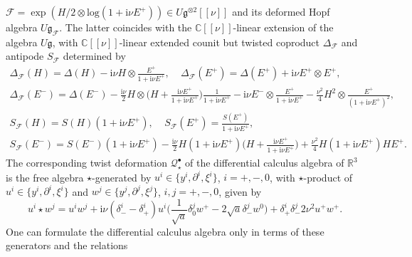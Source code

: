 \documentclass[a4paper,11pt]{article}
\begin{document}
$\mathcal{F}=\exp(H/2\otimes\mathrm{log}(1+\mathrm{i}\nu E^+))
\in U\mathfrak{g}^{\otimes 2}[[\nu]]$ and its deformed Hopf algebra
$U\mathfrak{g}_\mathcal{F}$. The latter coincides with the $\mathbb{C}[[\nu]]$-linear
extension of the algebra $U\mathfrak{g}$, with $\mathbb{C}[[\nu]]$-linear extended
counit but twisted coproduct $\Delta_\mathcal{F}$ and antipode $S_\mathcal{F}$
determined by
\begin{align*}
    \Delta_\mathcal{F}(H)=\Delta(H)-\mathrm{i}\nu H\otimes\frac{E^+}{1+\mathrm{i}\nu E^+},
    ~~~~~\Delta_\mathcal{F}(E^+)=\Delta(E^+)+\mathrm{i}\nu E^+\otimes E^+,\\
    \Delta_\mathcal{F}(E^-)=\Delta(E^-)
    -\frac{\mathrm{i}\nu}{2}H\otimes\bigg(H+\frac{\mathrm{i}\nu E^+}{1+\mathrm{i}\nu E^+}\bigg)\frac{1}{1+\mathrm{i}\nu E^+}
    -\mathrm{i}\nu E^-\otimes\frac{E^+}{1+\mathrm{i}\nu E^+}
    -\frac{\nu^2}{4}H^2\otimes\frac{E^+}{(1+\mathrm{i}\nu E^+)^2},\\
    S_\mathcal{F}(H)=S(H)(1+\mathrm{i}\nu E^+),
    ~~~~~S_\mathcal{F}(E^+)=\frac{S(E^+)}{1+\mathrm{i}\nu E^+},\\
    S_\mathcal{F}(E^-)=S(E^-)(1+\mathrm{i}\nu E^+)
    -\frac{\mathrm{i}\nu}{2}H(1+\mathrm{i}\nu E^+)\bigg(H+\frac{\mathrm{i}\nu E^+}{1+\mathrm{i}\nu E^+}\bigg)
    +\frac{\nu^2}{4}H(1+\mathrm{i}\nu E^+)HE^+.
\end{align*}
The corresponding twist deformation $\mathcal{Q}^\bullet_\star$ of the differential
calculus algebra of $\mathbb{R}^3$ is the free algebra $\star$-generated by
$u^i\in\{y^i,\partial^i,\xi^i\}$, $i=+,-,0$,
with $\star$-product of $u^i\in\{y^i,\partial^i,\xi^i\}$ and
$w^j\in\{y^j,\partial^j,\xi^j\}$, $i,j=+,-,0$, given by
\begin{equation}
    u^i\star w^j=u^iw^j
    +\mathrm{i}\nu(\delta^i_--\delta^i_+)u^i
    \bigg(\frac{1}{\sqrt{a}}\delta^j_0w^+-2\sqrt{a}\delta^j_-w^0\bigg)
    +\delta^i_+\delta^j_-2\nu^2u^+w^+.
\end{equation}
One can formulate the differential calculus algebra only in terms of these generators and the relations
\end{document}
